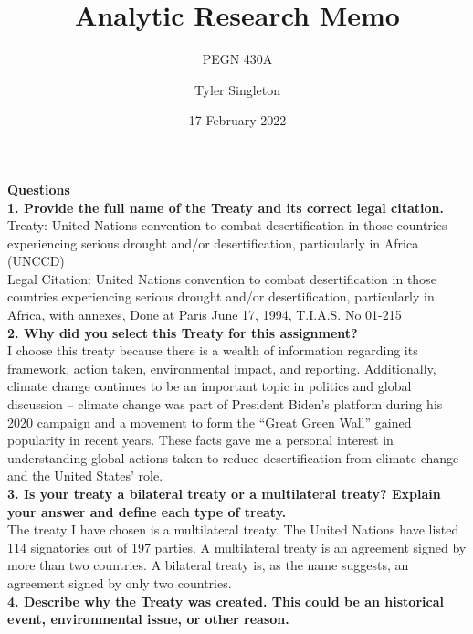 \documentclass[12pt]{article}
\title{Analytic Research Memo}
\subtitle{PEGN 430A}
\author{Tyler Singleton}
\date{17 February 2022}
\begin{document}
\maketitle

\newpage
\setlength{\parindent}{0pt}

\textbf{Questions} \\

\textbf{1. Provide the full name of the Treaty and its correct legal citation.} \\

Treaty: United Nations convention to combat desertification in those countries experiencing serious drought and/or desertification, particularly in Africa (UNCCD) \\

Legal Citation:
United Nations convention to combat desertification in those countries experiencing serious drought and/or desertification, particularly in Africa, with annexes, Done at Paris June 17, 1994, T.I.A.S. No 01-215 \\

\textbf{2. Why did you select this Treaty for this assignment?} \\

I choose this treaty because there is a wealth of information regarding its framework, action taken, environmental impact, and reporting. Additionally, climate change continues to be an important topic in politics and global discussion -- climate change was part of President Biden's platform during his 2020 campaign and a movement to form the ``Great Green Wall'' gained popularity in recent years. These facts gave me a personal interest in understanding global actions taken to reduce desertification from climate change and the United States' role.  \\

\textbf{3. Is your treaty a bilateral treaty or a multilateral treaty? Explain your answer and define each type of treaty. } \\

The treaty I have chosen is a multilateral treaty. The United Nations \cite{UnitedNations} have listed 114 signatories out of 197 parties. A multilateral treaty is an agreement signed by more than two countries. A bilateral treaty is, as the name suggests, an agreement signed by only two countries. \\

\textbf{4. Describe why the Treaty was created. This could be an historical event, environmental issue, or other reason.} \\
\end{document}
